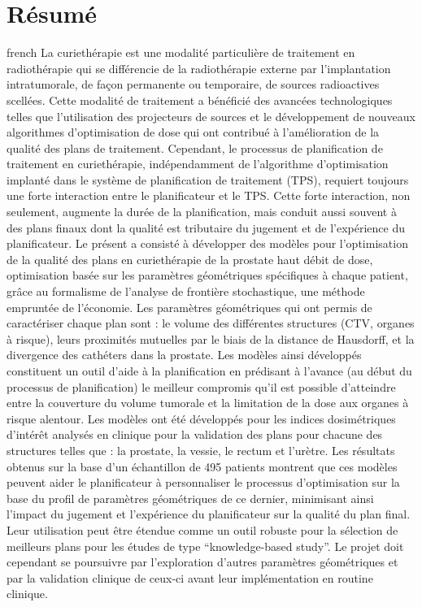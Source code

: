 \chapter*{Résumé}                      %
\begin{otherlanguage*}{french}
  La curiethérapie est une modalité particulière de traitement en radiothérapie qui se différencie de la radiothérapie externe par l’implantation intratumorale, de façon permanente ou temporaire, de sources radioactives scellées. Cette modalité de traitement a bénéficié des avancées technologiques telles que l’utilisation des projecteurs de sources et le développement de nouveaux algorithmes d’optimisation de dose qui ont contribué à l’amélioration de la qualité des plans de traitement. Cependant, le processus de planification de traitement en curiethérapie, indépendamment de l’algorithme d’optimisation implanté dans le système de planification de traitement (TPS), requiert toujours une forte interaction entre le planificateur et le TPS. Cette forte interaction, non seulement, augmente la durée de la planification, mais conduit aussi souvent à des plans finaux dont la qualité est tributaire du jugement et de l’expérience du planificateur.  Le présent a consisté à développer des modèles pour l’optimisation de la qualité des plans en curiethérapie de la prostate haut débit de dose, optimisation basée sur les paramètres géométriques spécifiques à chaque patient, grâce au formalisme de l’analyse de frontière stochastique, une méthode empruntée de l’économie. Les paramètres géométriques qui ont permis de caractériser chaque plan sont : le volume des différentes structures (CTV, organes à risque), leurs proximités mutuelles par le biais de la distance de Hausdorff, et la divergence des cathéters dans la prostate. Les modèles ainsi développés constituent un outil d’aide à la planification en prédisant à l’avance (au début du processus de planification) le meilleur compromis qu’il est possible d’atteindre entre la couverture du volume tumorale et la limitation de la dose aux organes à risque alentour. Les modèles ont été développés pour les indices dosimétriques d’intérêt analysés en clinique pour la validation des plans pour chacune des structures telles que : la prostate, la vessie, le rectum et l’urètre. Les résultats obtenus sur la base d’un échantillon de 495 patients montrent que ces modèles peuvent aider le planificateur à personnaliser le processus d’optimisation sur la base du profil de paramètres géométriques de ce dernier, minimisant ainsi l’impact du jugement et l’expérience du planificateur sur la qualité du plan final. Leur utilisation peut être étendue comme un outil robuste pour la sélection de meilleurs plans pour les études de type \enquote{knowledge-based study}. Le projet doit cependant se poursuivre par l’exploration d’autres paramètres géométriques et par la validation clinique de ceux-ci avant leur implémentation en routine clinique.
\end{otherlanguage*}
